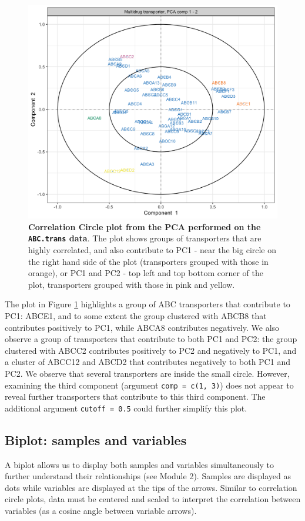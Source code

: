 \documentclass[]{book}
\begin{document}
\begin{figure}

{\centering \includegraphics[width=0.5\linewidth]{Figures/PCA/pca-var-ABStrans-ccp-1} 

}

\caption{\textbf{Correlation Circle plot from the PCA performed on the \texttt{ABC.trans} data}. The plot shows groups of transporters that are highly correlated, and also contribute to PC1 - near the big circle on the right hand side of the plot (transporters grouped with those in orange), or PC1 and PC2 - top left and top bottom corner of the plot, transporters grouped with those in pink and yellow.}\label{fig:pca-var-ABStrans-ccp}
\end{figure}



The plot in Figure \ref{fig:pca-var-ABStrans-ccp} highlights a group of ABC transporters that contribute to PC1: ABCE1, and to some extent the group clustered with ABCB8 that contributes positively to PC1, while ABCA8 contributes negatively. We also observe a group of transporters that contribute to both PC1 and PC2: the group clustered with ABCC2 contributes positively to PC2 and negatively to PC1, and a cluster of ABCC12 and ABCD2 that contributes negatively to both PC1 and PC2. We observe that several transporters are inside the small circle. However, examining the third component (argument \texttt{comp\ =\ c(1,\ 3)}) does not appear to reveal further transporters that contribute to this third component. The additional argument \texttt{cutoff\ =\ 0.5} could further simplify this plot.

\hypertarget{biplot-samples-and-variables}{%
\subsection{Biplot: samples and variables}\label{biplot-samples-and-variables}}

A biplot allows us to display both samples and variables simultaneously to further understand their relationships (see Module 2). Samples are displayed as dots while variables are displayed at the tips of the arrows. Similar to correlation circle plots, data must be centered and scaled to interpret the correlation between variables (as a cosine angle between variable arrows).
\end{document}
